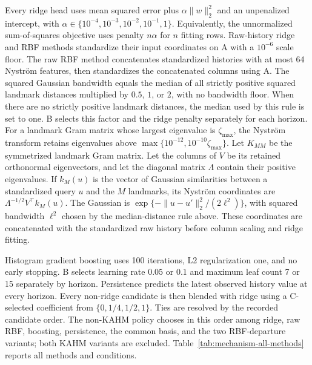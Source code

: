 Every ridge head uses mean squared error plus
$\alpha\|w\|_2^2$ and an unpenalized intercept, with
$\alpha\in\{10^{-4},10^{-3},10^{-2},10^{-1},1\}$. Equivalently,
the unnormalized sum-of-squares objective uses penalty $n\alpha$ for
$n$ fitting rows. Raw-history ridge and RBF methods standardize their
input coordinates on A with a $10^{-6}$ scale floor. The raw RBF method
concatenates standardized histories with at most 64 Nystr\"om features,
then standardizes the concatenated columns using A. The squared Gaussian
bandwidth equals the median of all strictly positive squared landmark
distances multiplied by $0.5$, $1$, or $2$, with no bandwidth floor.
When there are no strictly positive landmark distances, the median
used by this rule is set to one. B
selects this factor and the ridge penalty separately for each horizon.
For a landmark Gram matrix whose largest eigenvalue is $\zeta_{\max}$,
the Nystr\"om transform retains eigenvalues above
$\max\{10^{-12},10^{-10}\zeta_{\max}\}$.
Let $K_{MM}$ be the symmetrized landmark Gram matrix. Let the columns
of $V$ be its retained orthonormal eigenvectors, and let the diagonal
matrix $\Lambda$ contain their positive eigenvalues. If $k_M(u)$ is the vector of Gaussian similarities between
a standardized query $u$ and the $M$ landmarks, its Nystr\"om coordinates
are $\Lambda^{-1/2}V^\top k_M(u)$. The Gaussian is
$\exp\{-\|u-u'\|_2^2/(2\ell^2)\}$, with squared bandwidth $\ell^2$
chosen by the median-distance rule above. These coordinates are
concatenated with the standardized raw history before column scaling
and ridge fitting.

Histogram gradient boosting uses 100 iterations, L2 regularization
one, and no early stopping. B selects learning rate $0.05$ or $0.1$ and maximum leaf count
7 or 15 separately by horizon. Persistence predicts the latest observed
history value at every horizon. Every non-ridge candidate is then blended
with ridge using a C-selected coefficient from $\{0,1/4,1/2,1\}$.
Ties are resolved by the recorded candidate order. The non-KAHM policy
chooses in this order among ridge, raw RBF, boosting, persistence, the common basis,
and the two RBF-departure variants; both KAHM variants are excluded.
Table~\ref{tab:mechanism-all-methods} reports all methods and conditions.

\begin{table}[!htbp]
\centering\scriptsize
\setlength{\tabcolsep}{3pt}
\caption{All ten procedures, every declared law and both added-noise levels.
Entries are mean horizon-averaged A-variance-normalized D MSE over 24
repetitions; lower is better. The first six columns enter the nonlinear
aggregate with equal weight. The final two form the separate linear control.
These conditionwise summaries are descriptive. ``Unbounded'' omits only the
departure radial bound. Persistence and raw nonlinear controls include their
C-selected blend with ridge.}
\label{tab:mechanism-all-methods}

\end{table}

